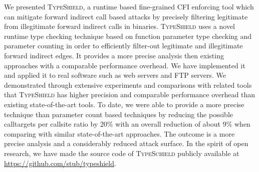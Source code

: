 We presented \textsc{TypeShield}, a runtime based fine-grained CFI enforcing
tool which can mitigate forward indirect call based attacks by
precisely filtering legitimate from illegitimate forward indirect calls in binaries.
\textsc{TypeShield} uses a novel runtime type checking technique based on function parameter
type checking and parameter counting in order to efficiently filter-out legitimate
and illegitimate forward indirect edges.
It provides a more precise analysis then existing approaches with a
comparable performance overhead.
We have implemented it and applied it to real software such as web servers and FTP servers.
We demonstrated through extensive experiments and comparisons with related tools
that \textsc{TypeShield} has higher precision and comparable performance overhead than 
existing state-of-the-art tools. To date, we were able to provide a more precise
technique than parameter count based techniques by reducing the possible calltargets 
per callsite ratio by 20\% with an overall reduction of about 
9\% when comparing with similar state-of-the-art approaches.
The outcome is a more precise analysis and a considerably reduced attack surface.
In the spirit of open research,
we have made the source code of \textsc{TypeSchield}
publicly available at \url{https://github.com/stub/typeshield}.


